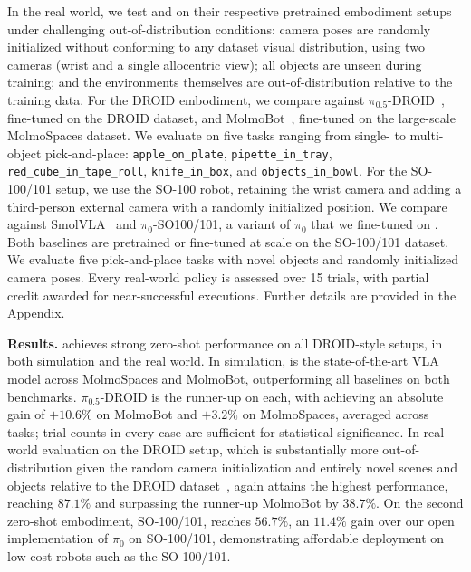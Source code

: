 In the real world, we test \molmoacttdroid and \molmoacttso on their respective pretrained embodiment setups under challenging out-of-distribution conditions: camera poses are randomly initialized without conforming to any dataset visual distribution, using two cameras (wrist and a single allocentric view); all objects are unseen during training; and the environments themselves are out-of-distribution relative to the training data. For the DROID embodiment, we compare \molmoacttdroid against $\pi_{0.5}$-DROID~\citep{intelligence2025pi05visionlanguageactionmodelopenworld}, fine-tuned on the DROID dataset, and MolmoBot~\citep{deshpande2026molmob0t}, fine-tuned on the large-scale MolmoSpaces dataset. We evaluate on five tasks ranging from single- to multi-object pick-and-place: \texttt{apple\_on\_plate}, \texttt{pipette\_in\_tray}, \texttt{red\_cube\_in\_tape\_roll}, \texttt{knife\_in\_box}, and \texttt{objects\_in\_bowl}. For the SO-100/101 setup, we use the SO-100 robot, retaining the wrist camera and adding a third-person external camera with a randomly initialized position. We compare \molmoacttso against SmolVLA~\citep{shukor2025smolvlavisionlanguageactionmodelaffordable} and $\pi_{0}$-SO100/101, a variant of $\pi_{0}$ that we fine-tuned on \molmoacttsodata. Both baselines are pretrained or fine-tuned at scale on the SO-100/101 dataset. We evaluate five pick-and-place tasks with novel objects and randomly initialized camera poses. Every real-world policy is assessed over 15 trials, with partial credit awarded for near-successful executions. Further details are provided in the Appendix.

\textbf{Results.} \molmoacttdroid achieves strong zero-shot performance on all DROID-style setups, in both simulation and the real world. In simulation, \molmoacttdroid is the state-of-the-art VLA model across MolmoSpaces and MolmoBot, outperforming all baselines on both benchmarks. $\pi_{0.5}$-DROID is the runner-up on each, with \molmoactt achieving an absolute gain of $+10.6\%$ on MolmoBot and $+3.2\%$ on MolmoSpaces, averaged across tasks; trial counts in every case are sufficient for statistical significance. In real-world evaluation on the DROID setup, which is substantially more out-of-distribution given the random camera initialization and entirely novel scenes and objects relative to the DROID dataset~\citep{khazatsky2024droid}, \molmoactt again attains the highest performance, reaching $87.1\%$ and surpassing the runner-up MolmoBot by $38.7\%$. On the second zero-shot embodiment, SO-100/101, \molmoacttso reaches $56.7\%$, an $11.4\%$ gain over our open implementation of $\pi_{0}$ on SO-100/101, demonstrating affordable deployment on low-cost robots such as the SO-100/101.

